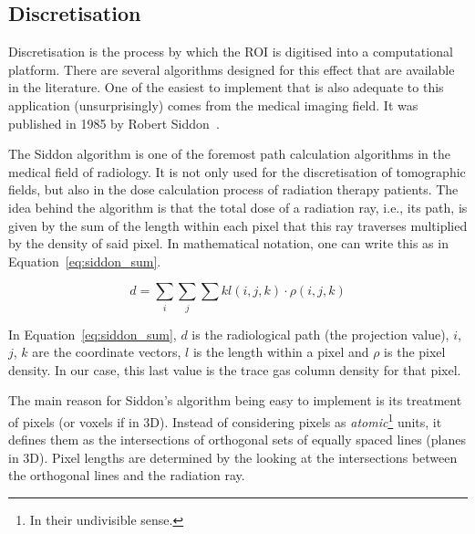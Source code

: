 \subsection{Discretisation}%
\label{sub:discretisation}

Discretisation is the process by which the \gls{ROI} is digitised into a
computational platform. There are several algorithms designed for this
effect that are available in the literature. One of the easiest to
implement that is also adequate to this application (unsurprisingly)
comes from the medical imaging field. It was published in 1985 by Robert
Siddon~\cite{Siddon1985}.

The Siddon algorithm is one of the foremost path calculation algorithms
in the medical field of radiology. It is not only used for the
discretisation of tomographic fields, but also in the dose calculation
process of radiation therapy patients. The idea behind the algorithm is
that the total dose of a radiation ray, i.e., its path, is given by the
sum of the length within each pixel that this ray traverses multiplied
by the density of said pixel. In mathematical notation, one can write
this as in Equation~\ref{eq:siddon_sum}.

\begin{equation}
    \label{eq:siddon_sum}
    d = \sum_{i}\sum_{j}\sum{k} l(i, j, k)\cdot\rho(i, j, k)
\end{equation}

In Equation~\ref{eq:siddon_sum}, $d$ is the radiological path (the
projection value), $i$, $j$, $k$ are the coordinate vectors, $l$ is the
length within a pixel and $\rho$ is the pixel density. In our case, this
last value is the trace gas column density for that pixel.

The main reason for Siddon's algorithm being easy to implement is its
treatment of pixels (or voxels if in 3D). Instead of considering pixels
as \emph{atomic}\footnote{In their undivisible sense.} units, it defines
them as the intersections of orthogonal sets of equally spaced lines
(planes in 3D). Pixel lengths are determined by the looking at the
intersections between the orthogonal lines and the radiation ray. 

